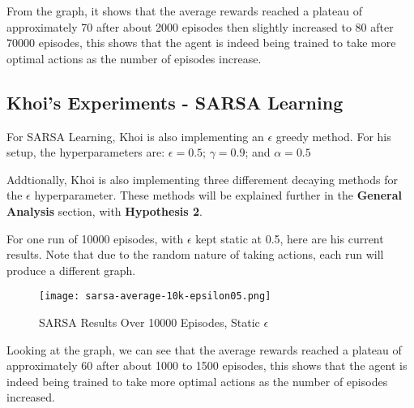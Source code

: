 From the graph, it shows that the average rewards reached a plateau of approximately 70 after about 2000 episodes then slightly increased to 80 after 70000 episodes, this shows that the agent is indeed being trained to take more optimal actions as the number of episodes increase. 


\subsection{Khoi's Experiments - SARSA Learning}
For SARSA Learning, Khoi is also implementing an $\epsilon$ greedy method. For his setup, the hyperparameters are: $\epsilon = 0.5$; $\gamma = 0.9$; and $\alpha = 0.5$

Addtionally, Khoi is also implementing three differement decaying methods for the $\epsilon$ hyperparameter. These methods will be explained further in the \textbf{General Analysis} section, with \textbf{Hypothesis 2}.

For one run of 10000 episodes, with $\epsilon$ kept static at 0.5, here are his current results. Note that due to the random nature of taking actions, each run will produce a different graph.

\begin{figure}[H] %
    \centering
    \texttt{[image: sarsa-average-10k-epsilon05.png]}
    \caption{SARSA Results Over 10000 Episodes, Static $\epsilon$}
\end{figure}

Looking at the graph, we can see that the average rewards reached a plateau of approximately 60 after about 1000 to 1500 episodes, this shows that the agent is indeed being trained to
take more optimal actions as the number of episodes increased.




